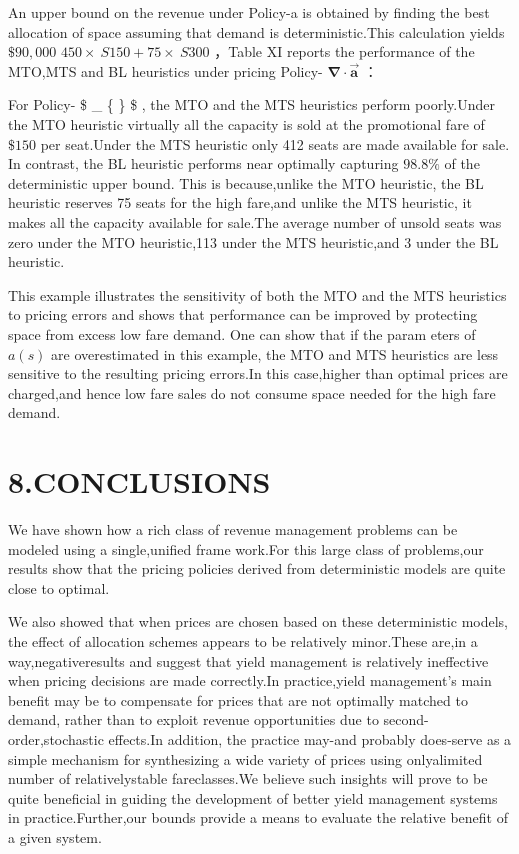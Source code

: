 An upper bound on the revenue under Policy-a is obtained by finding the
best allocation of space assuming that demand is deterministic.This
calculation yields \(\$ 90,000\)
\(4 5 0 \times \ S 1 5 0 + 7 5 \times \ S 3 0 0\) ，Table XI reports the
performance of the MTO,MTS and BL heuristics under pricing Policy-
\(\mathbf { \nabla } \cdot \mathbf { \vec { a } }\) ：

For Policy- \$ \_ \{ \} \$ , the MTO and the MTS heuristics perform
poorly.Under the MTO heuristic virtually all the capacity is sold at the
promotional fare of \(\$ 150\) per seat.Under the MTS heuristic only 412
seats are made available for sale. In contrast, the BL heuristic
performs near optimally capturing \(9 8 . 8 \%\) of the deterministic
upper bound. This is because,unlike the MTO heuristic, the BL heuristic
reserves 75 seats for the high fare,and unlike the MTS heuristic, it
makes all the capacity available for sale.The average number of unsold
seats was zero under the MTO heuristic,113 under the MTS heuristic,and 3
under the BL heuristic.

This example illustrates the sensitivity of both the MTO and the MTS
heuristics to pricing errors and shows that performance can be improved
by protecting space from excess low fare demand. One can show that if
the param eters of \(a ( s )\) are overestimated in this example, the
MTO and MTS heuristics are less sensitive to the resulting pricing
errors.In this case,higher than optimal prices are charged,and hence low
fare sales do not consume space needed for the high fare demand.

\section{8.CONCLUSIONS}\label{conclusions}

We have shown how a rich class of revenue management problems can be
modeled using a single,unified frame work.For this large class of
problems,our results show that the pricing policies derived from
deterministic models are quite close to optimal.

We also showed that when prices are chosen based on these deterministic
models, the effect of allocation schemes appears to be relatively
minor.These are,in a way,negativeresults and suggest that yield
management is relatively ineffective when pricing decisions are made
correctly.In practice,yield management's main benefit may be to
compensate for prices that are not optimally matched to demand, rather
than to exploit revenue opportunities due to second-order,stochastic
effects.In addition, the practice may-and probably does-serve as a
simple mechanism for synthesizing a wide variety of prices using
onlyalimited number of relativelystable fareclasses.We believe such
insights will prove to be quite beneficial in guiding the development of
better yield management systems in practice.Further,our bounds provide a
means to evaluate the relative benefit of a given system.

